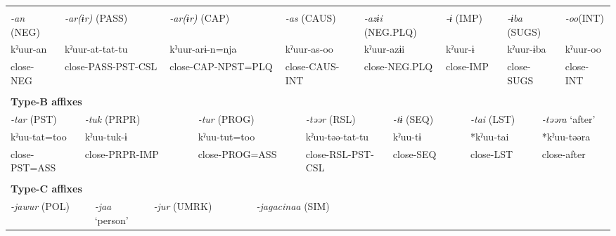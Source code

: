 \tabletail{}
\tablelasttail{}
\begin{tabularx}{\textwidth}{XXXXXXXXXXXXXXXXXXXXXXX}
\lsptoprule
\multicolumn{23}{X}{{\bfseries Type-A affixes}}\\
{ \textit{{}-an} (NEG)} & \multicolumn{6}{X}{{ \textit{{}-ar(ɨr)} (PASS)}} & \multicolumn{4}{X}{{ \textit{{}-ar(ɨr)} (CAP)}} & \multicolumn{4}{X}{{ \textit{{}-as} (CAUS)}} & \multicolumn{3}{X}{{ \textit{{}-azɨi} (NEG.PLQ)}} & \multicolumn{2}{X}{{ \textit{{}-ɨ} (IMP)}} & \multicolumn{2}{X}{{ \textit{{}-ɨba} (SUGS)}} & { \textit{{}-oo}(INT)}\\
{ kˀuur-an} & \multicolumn{6}{X}{{ kˀuur-at-tat-tu}} & \multicolumn{4}{X}{{ kˀuur-arɨ-n=nja}} & \multicolumn{4}{X}{{ kˀuur-as-oo}} & \multicolumn{3}{X}{{ kˀuur-azɨi}} & \multicolumn{2}{X}{{ kˀuur-ɨ}} & \multicolumn{2}{X}{{ kˀuur-ɨba}} & { kˀuur-oo}\\
close-NEG & \multicolumn{6}{X}{close-PASS-PST-CSL} & \multicolumn{4}{X}{close-CAP-NPST=PLQ} & \multicolumn{4}{X}{close-CAUS-INT} & \multicolumn{3}{X}{close-NEG.PLQ} & \multicolumn{2}{X}{close-IMP} & \multicolumn{2}{X}{close-SUGS} & close-INT\\
\multicolumn{23}{X}{}\\
\multicolumn{23}{X}{{\bfseries Type-B affixes}}\\
\multicolumn{3}{X}{{ \textit{{}-tar} (PST)}} & \multicolumn{5}{X}{{ \textit{{}-tuk} (PRPR)}} & \multicolumn{4}{X}{{ \textit{{}-tur} (PROG)}} & \multicolumn{4}{X}{{ \textit{{}-təər} (RSL)}} & \multicolumn{3}{X}{{ \textit{{}-tɨ} (SEQ)}} & \multicolumn{2}{X}{{ \textit{{}-tai} (LST)}} & \multicolumn{2}{X}{{ \textit{{}-təəra} ‘after’}}\\
\multicolumn{3}{X}{{ kˀuu-tat=too}} & \multicolumn{5}{X}{{ kˀuu-tuk-ɨ}} & \multicolumn{4}{X}{{ kˀuu-tut=too}} & \multicolumn{4}{X}{{ kˀuu-təə-tat-tu}} & \multicolumn{3}{X}{{ kˀuu-tɨ}} & \multicolumn{2}{X}{{ *kˀuu-tai}} & \multicolumn{2}{X}{{ *kˀuu-təəra}}\\
\multicolumn{3}{X}{close-PST=ASS} & \multicolumn{5}{X}{close-PRPR-IMP} & \multicolumn{4}{X}{close-PROG=ASS} & \multicolumn{4}{X}{close-RSL-PST-CSL} & \multicolumn{3}{X}{close-SEQ} & \multicolumn{2}{X}{close-LST} & \multicolumn{2}{X}{{ close-after}}\\
\multicolumn{3}{X}{} & \multicolumn{5}{X}{} & \multicolumn{4}{X}{} & \multicolumn{4}{X}{} & \multicolumn{3}{X}{} & \multicolumn{2}{X}{} & \multicolumn{2}{X}{}\\
\multicolumn{23}{X}{{\bfseries Type-C affixes}}\\
\multicolumn{4}{X}{{ \textit{{}-jawur} (POL)}} & \multicolumn{2}{X}{{ \textit{{}-jaa} ‘person’}} & \multicolumn{4}{X}{{ \textit{{}-jur} (UMRK)}} & \multicolumn{4}{X}{{ \textit{{}-jagacinaa} (SIM)}} & \multicolumn{9}{X}{}\\

\end{tabularx}
